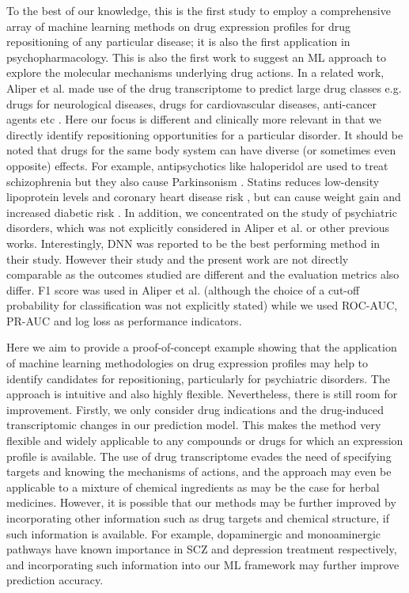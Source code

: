   To the best of our knowledge, this is the first study to employ a comprehensive array of machine learning methods on drug expression profiles for drug repositioning of any particular disease; it is also the first application in psychopharmacology. This is also the first work to suggest an ML approach to explore the molecular mechanisms underlying drug actions. In a related work, Aliper et al. made use of the drug transcriptome to predict large drug classes e.g. drugs for neurological diseases, drugs for cardiovascular diseases, anti-cancer agents etc \cite{aliper2016deep}. Here our focus is different and clinically more relevant in that we directly identify repositioning opportunities for a particular disorder. It should be noted that drugs for the same body system can have diverse (or sometimes even opposite) effects. For example, antipsychotics like haloperidol are used to treat schizophrenia but they also cause Parkinsonism \cite{markey1984intraneuronal}. Statins reduces low-density lipoprotein levels and coronary heart disease risk \cite{chou2016statins}, but can cause weight gain and increased diabetic risk \cite{swerdlow2015hmg}. In addition, we concentrated on the study of psychiatric disorders, which was not explicitly considered in Aliper et al. \cite{aliper2016deep} or other previous works. Interestingly, DNN was reported to be the best performing method in their study. However their study \cite{aliper2016deep} and the present work are not directly comparable as the outcomes studied are different and the evaluation metrics also differ. F1 score was used in Aliper et al. \cite{aliper2016deep} (although the choice of a cut-off probability for classification was not explicitly stated) while we used ROC-AUC, PR-AUC and log loss as performance indicators.

  Here we aim to provide a proof-of-concept example showing that the application of machine learning methodologies on drug expression profiles may help to identify candidates for repositioning, particularly for psychiatric disorders. The approach is intuitive and also highly flexible. Nevertheless, there is still room for improvement. Firstly, we only consider drug indications and the drug-induced transcriptomic changes in our prediction model. This makes the method very flexible and widely applicable to any compounds or drugs for which an expression profile is available. The use of drug transcriptome evades the need of specifying targets and knowing the mechanisms of actions, and the approach may even be applicable to a mixture of chemical ingredients as may be the case for herbal medicines. However, it is possible that our methods may be further improved by incorporating other information such as drug targets and chemical structure, if such information is available. For example, dopaminergic and monoaminergic pathways have known importance in SCZ and depression treatment respectively, and incorporating such information into our ML framework may further improve prediction accuracy. 


